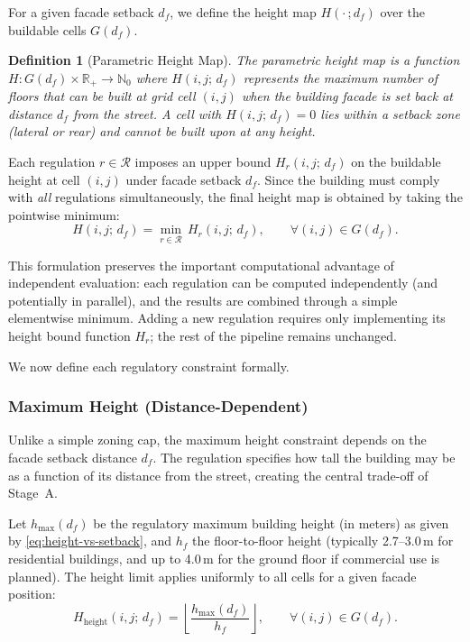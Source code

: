 \documentclass[11pt,a4paper]{article}
\newtheorem{definition}{Definition}
\newcommand{\R}{\mathbb{R}}
\newcommand{\N}{\mathbb{N}}
\newcommand{\calR}{\mathcal{R}}
\begin{document}
For a given facade setback $d_f$, we define the height map
$H(\cdot\,; d_f)$ over the buildable cells $G(d_f)$.

\begin{definition}[Parametric Height Map]
The \emph{parametric height map} is a function $H: G(d_f) \times \R_+
\to \N_0$ where $H(i,j;\,d_f)$ represents the maximum number of floors
that can be built at grid cell $(i,j)$ when the building facade is set
back at distance $d_f$ from the street. A cell with $H(i,j;\,d_f) = 0$
lies within a setback zone (lateral or rear) and cannot be built upon
at any height.
\end{definition}

Each regulation $r \in \calR$ imposes an upper bound $H_r(i,j;\,d_f)$
on the buildable height at cell $(i,j)$ under facade setback $d_f$.
Since the building must comply with \emph{all} regulations
simultaneously, the final height map is obtained by taking the
pointwise minimum:
\begin{equation}\label{eq:heightmap}
    H(i,j;\,d_f) = \min_{r \in \calR}\, H_r(i,j;\,d_f), \qquad \forall (i,j) \in G(d_f).
\end{equation}

This formulation preserves the important computational advantage of
independent evaluation: each regulation can be computed independently
(and potentially in parallel), and the results are combined through a
simple elementwise minimum. Adding a new regulation requires only
implementing its height bound function $H_r$; the rest of the pipeline
remains unchanged.

We now define each regulatory constraint formally.

\subsubsection{Maximum Height (Distance-Dependent)}

Unlike a simple zoning cap, the maximum height constraint depends on
the facade setback distance $d_f$. The regulation specifies how tall
the building may be as a function of its distance from the street,
creating the central trade-off of Stage~A.

Let $h_{\max}(d_f)$ be the regulatory maximum building height (in
meters) as given by \eqref{eq:height-vs-setback}, and $h_f$ the
floor-to-floor height (typically 2.7--3.0\,m for residential buildings,
and up to 4.0\,m for the ground floor if commercial use is planned).
The height limit applies uniformly to all cells for a given facade
position:
\begin{equation}
    H_{\text{height}}(i,j;\,d_f) = \left\lfloor \frac{h_{\max}(d_f)}{h_f} \right\rfloor, \qquad \forall (i,j) \in G(d_f).
\end{equation}
\end{document}
